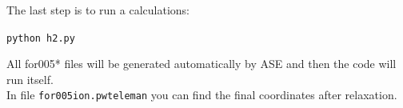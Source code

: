 \documentclass[10pt]{beamer}
\begin{document}

\begin{frame}
The last step is to run a calculations:\\
\hspace*{0.2cm}

{\tt python h2.py}\\
\hspace*{0.2cm}

All for005* files will be generated automatically by ASE and then the code will run itself. \\
In file {\tt for005ion.pwteleman} you can find the final coordinates after relaxation. 

\end{frame}

\end{document}
